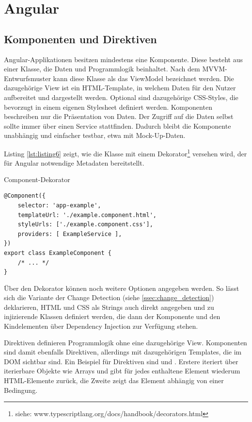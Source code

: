 \section{Angular}
\subsection{Komponenten und Direktiven}
Angular-Applikationen besitzen mindestens eine Komponente. Diese besteht aus einer Klasse, die Daten und Programmlogik beinhaltet. Nach dem MVVM-Entwurfsmuster kann diese Klasse als das ViewModel bezeichnet werden. Die dazugehörige View ist ein HTML-Template, in welchem Daten für den Nutzer aufbereitet und dargestellt werden. Optional sind dazugehörige CSS-Styles, die bevorzugt in einem eigenen Stylesheet definiert werden. Komponenten beschreiben nur die Präsentation von Daten. Der Zugriff auf die Daten selbst sollte immer über einen Service stattfinden. Dadurch bleibt die Komponente unabhängig und einfacher testbar, etwa mit Mock-Up-Daten.

Listing \ref{lst:listing6} zeigt, wie die Klasse mit einem Dekorator\footnote{siehe: www.typescriptlang.org/docs/handbook/decorators.html} versehen wird, der für Angular notwendige Metadaten bereitstellt.

\begin{listing}
\caption{Component-Dekorator}
\label{lst:listing6}
\begin{verbatim}
@Component({
    selector: 'app-example',
    templateUrl: './example.component.html',
    styleUrls: ['./example.component.css'],
    providers: [ ExampleService ],
})
export class ExampleComponent {
    /* ... */
}
\end{verbatim}
\end{listing}

Über den Dekorator können noch weitere Optionen angegeben werden. So lässt sich die Variante der Change Detection (siehe \ref{ssec:change_detection}) deklarieren, HTML und CSS als Strings auch direkt angegeben und zu injizierende Klassen definiert werden, die dann der Komponente und den Kindelementen über Dependency Injection zur Verfügung stehen.\cite{AngularConcepts}\cite{ComponentDecorator}

Direktiven definieren Programmlogik ohne eine dazugehörige View. Komponenten sind damit ebenfalls Direktiven, allerdings mit dazugehörigen Templates, die im DOM sichtbar sind. Ein Beispiel für Direktiven sind  und . Erstere iteriert über iterierbare Objekte wie Arrays und gibt für jedes enthaltene Element wiederum HTML-Elemente zurück, die Zweite zeigt das Element abhängig von einer Bedingung.

